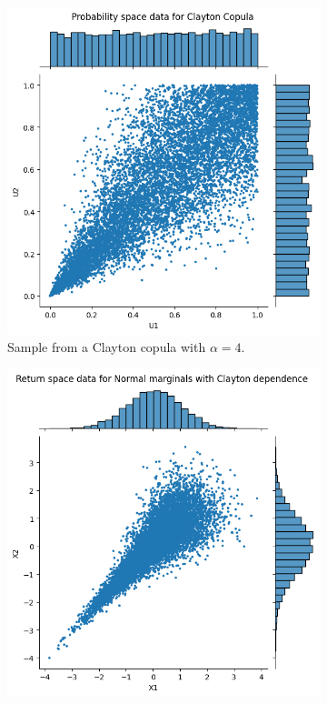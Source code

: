 \begin{figure}[h]
    \centering
    \begin{subfigure}[t]{0.45\linewidth}
        \centering
        \includegraphics[width=\linewidth]{3Theory/pictures/ProbabilitySpaceClayton.png}
        \caption{Sample from a Clayton copula with $\alpha = 4$. } 
        \label{fig:ProbabilitySpaceDataClayton}
    \end{subfigure}
    \hfill
    \begin{subfigure}[t]{0.45\linewidth}
        \centering
        \includegraphics[width=\linewidth]{3Theory/pictures/ReturnSpaceDataClayton.png}

\end{subfigure}
\end{figure}
